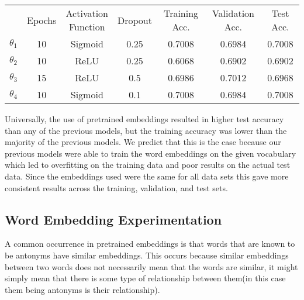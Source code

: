 \documentclass[12pt,notitlepage]{article}
\begin{document}
\begin{table}[H]
\centering
\begin{tabular}{ccccccc}
                                  & Epochs                  & \shortstack{Activation \\ Function}         & Dropout                   & Training Acc.               & Validation Acc.             & Test Acc.                   \\ \cline{2-7} 
\multicolumn{1}{c|}{$\theta_{1}$} & \multicolumn{1}{c|}{10} & \multicolumn{1}{c|}{Sigmoid} & \multicolumn{1}{c|}{0.25} & \multicolumn{1}{||c|}{0.7008} & \multicolumn{1}{c|}{0.6984} & \multicolumn{1}{c|}{0.7008} \\ \cline{2-7} 
\multicolumn{1}{c|}{$\theta_{2}$} & \multicolumn{1}{c|}{10} & \multicolumn{1}{c|}{ReLU}    & \multicolumn{1}{c|}{0.25} & \multicolumn{1}{||c|}{0.6068} & \multicolumn{1}{c|}{0.6902} & \multicolumn{1}{c|}{0.6902} \\ \cline{2-7} 
\multicolumn{1}{c|}{$\theta_{3}$} & \multicolumn{1}{c|}{15} & \multicolumn{1}{c|}{ReLU}    & \multicolumn{1}{c|}{0.5}  & \multicolumn{1}{||c|}{0.6986} & \multicolumn{1}{c|}{0.7012} & \multicolumn{1}{c|}{0.6968} \\ \cline{2-7} 
\multicolumn{1}{c|}{$\theta_{4}$} & \multicolumn{1}{c|}{10} & \multicolumn{1}{c|}{Sigmoid} & \multicolumn{1}{c|}{0.1}  & \multicolumn{1}{||c|}{0.7008} & \multicolumn{1}{c|}{0.6984} & \multicolumn{1}{c|}{0.7008} \\ \cline{2-7} 
\end{tabular}
\end{table}

\par Universally, the use of pretrained embeddings resulted in higher test accuracy than any of the previous models, but the training accuracy was lower than the majority of the previous models. We predict that this is the case because our previous models were able to train the word embeddings on the given vocabulary which led to overfitting on the training data and poor results on the actual test data. Since the embeddings used were the same for all data sets this gave more consistent results across the training, validation, and test sets. 

\subsection{Word Embedding Experimentation}
A common occurrence in pretrained embeddings is that words that are known to be antonyms have similar embeddings. This occurs because similar embeddings between two words does not necessarily mean that the words are similar, it might simply mean that there is some type of relationship between them(in this case them being antonyms is their relationship). 
\end{document}
